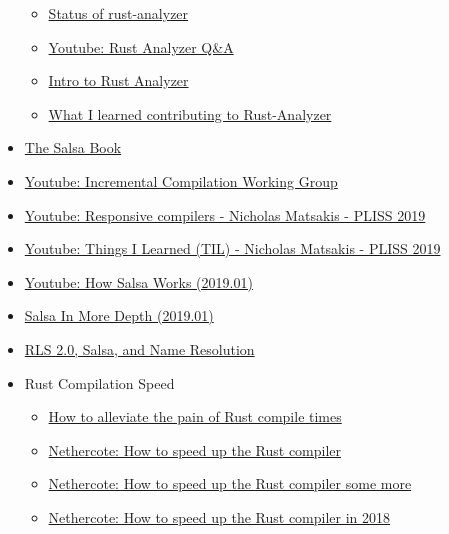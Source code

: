 \documentclass[12pt, a4paper]{report}
\begin{document}
\begin{itemize}[noitemsep]
\begin{itemize}[noitemsep]
	\item \href{https://ferrous-systems.com/blog/rust-analyzer-status-opencollective/}{\Square Status of rust-analyzer}
	\item \href{https://www.youtube.com/playlist?list=PLXajQV_H-DxLMBt0amcuxgTeOTj6L-YGl}{\Square Youtube: Rust Analyzer Q\&A}
	\item \href{https://blog.logrocket.com/intro-to-rust-analyzer/}{ Intro to Rust Analyzer}
	\item \href{https://dev.to/bnjjj/what-i-learned-contributing-to-rust-analyzer-4c7e}{ What I learned contributing to Rust-Analyzer}
	\end{itemize}
\item \href{https://salsa-rs.github.io/salsa/}{\Square The Salsa Book}
\item \href{https://www.youtube.com/playlist?list=PL85XCvVPmGQh0P_VEPVM2ZIlBwl4MQMNY}{\Square Youtube: Incremental Compilation Working Group}
\item \href{https://www.youtube.com/watch?v=N6b44kMS6OM}{\Square Youtube: Responsive compilers - Nicholas Matsakis - PLISS 2019}
\item \href{https://www.youtube.com/watch?v=LIYkT3p5gTs}{\Square Youtube: Things I Learned (TIL) - Nicholas Matsakis - PLISS 2019}
\item \href{https://www.youtube.com/watch?v=_muY4HjSqVw}{\Square Youtube: How Salsa Works (2019.01)}
\item \href{https://www.youtube.com/watch?v=i_IhACacPRY}{\Square Salsa In More Depth (2019.01)}
\item \href{https://www.youtube.com/watch?v=Xr-rBqLr-G4}{\Square RLS 2.0, Salsa, and Name Resolution}
\item Rust Compilation Speed
	\begin{itemize}[noitemsep]
	\item \href{https://vfoley.xyz/rust-compile-speed-tips/}{\Square How to alleviate the pain of Rust compile times}
	\item \href{https://blog.mozilla.org/nnethercote/2016/10/14/how-to-speed-up-the-rust-compiler/}{\Square Nethercote: How to speed up the Rust compiler}
	\item \href{https://blog.mozilla.org/nnethercote/2016/11/23/how-to-speed-up-the-rust-compiler-some-more/}{\Square Nethercote: How to speed up the Rust compiler some more}
	\item \href{https://blog.mozilla.org/nnethercote/2018/04/30/how-to-speed-up-the-rust-compiler-in-2018/}{\Square Nethercote: How to speed up the Rust compiler in 2018}

\end{itemize}
\end{itemize}
\end{document}
